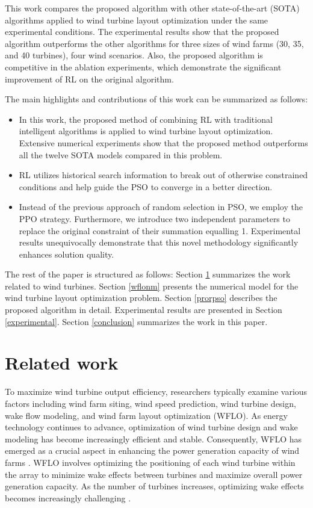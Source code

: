 \documentclass[review]{elsarticle}
\begin{document}
This work compares the proposed algorithm with other state-of-the-art (SOTA) algorithms applied to wind turbine layout optimization under the same experimental conditions. The experimental results show that the proposed algorithm outperforms the other algorithms for three sizes of wind farms (30, 35, and 40 turbines), four wind scenarios. Also, the proposed algorithm is competitive in the ablation experiments, which demonstrate the significant improvement of RL on the original algorithm.

The main highlights and contributions of this work can be summarized as follows:

\begin{itemize}
	\item [1)] In this work, the proposed method of combining RL with traditional intelligent algorithms is applied to wind turbine layout optimization. Extensive numerical experiments show that the proposed method outperforms all the twelve SOTA models compared in this problem.
	\item [2)] RL utilizes historical search information to break out of otherwise constrained conditions and help guide the PSO to converge in a better direction.
	\item [3)] Instead of the previous approach of random selection in PSO, we employ the PPO strategy. Furthermore, we introduce two independent parameters to replace the original constraint of their summation equalling 1. Experimental results unequivocally demonstrate that this novel methodology significantly enhances solution quality.
\end{itemize}

The rest of the paper is structured as follows: Section \ref{relatedwork} summarizes the work related to wind turbines. Section \ref{wflonm} presents the numerical model for the wind turbine layout optimization problem. Section \ref{prorpso} describes the proposed algorithm in detail. Experimental results are presented in Section \ref{experimental}. Section \ref{conclusion} summarizes the work in this paper.

\section{Related work}\label{relatedwork}

To maximize wind turbine output efficiency, researchers typically examine various factors including wind farm siting, wind speed prediction, wind turbine design, wake flow modeling, and wind farm layout optimization (WFLO). As energy technology continues to advance, optimization of wind turbine design and wake modeling has become increasingly efficient and stable. Consequently, WFLO has emerged as a crucial aspect in enhancing the power generation capacity of wind farms \cite{rezaeiha2020framework, chen2020medium}. WFLO involves optimizing the positioning of each wind turbine within the array to minimize wake effects between turbines and maximize overall power generation capacity. As the number of turbines increases, optimizing wake effects becomes increasingly challenging \cite{saad2020performance}.
\end{document}
